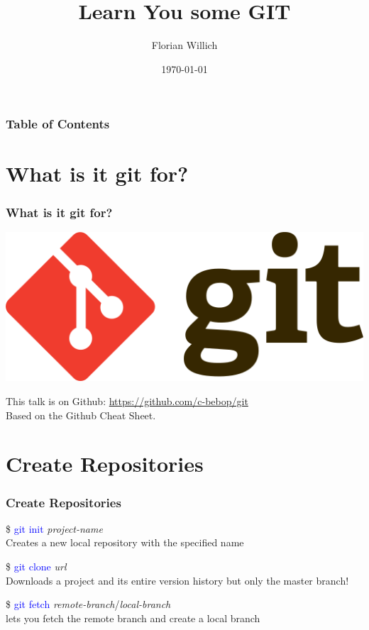 \documentclass[aspectratio=169]{beamer}
\title[Learn You some GIT] %
{Learn You some GIT}
\author[Florian Willich]{Florian Willich}
\institute[BIT]
{
  Quality and Usability Lab\\
  Berlin Institute of Technology
}
\date{\today}
\begin{document}
\frame{\titlepage}

\begin{frame}
\frametitle{Table of Contents}
\tableofcontents
\end{frame}

\section{What is it git for?}
\begin{frame}

\frametitle{What is it git for?}

\begin{center}
\includegraphics*[scale=0.5]{images/Git-logo.png}

This talk is on Github: \hyperlink{https://github.com/c-bebop/git}{https://github.com/c-bebop/git}\\
Based on the Github Cheat Sheet.
\end{center}

\end{frame}

\section{Create Repositories}
\begin{frame}

\frametitle{Create Repositories}

\$ \textcolor{blue}{git init} \textit{project-name}\\
Creates a new local repository with the specified name

\pause

\$ \textcolor{blue}{git clone} \textit{url}\\
Downloads a project and its entire version history but only the master branch!

\pause

\$ \textcolor{blue}{git fetch} \textit{remote-branch}/\textit{local-branch}\\
lets you fetch the remote branch and create a local branch

\end{frame}
\end{document}

